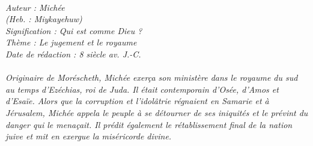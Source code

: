 \BFont
\noindent\hrulefill
{\footnotesize
\textit{
\bigskip
{\centering{}
\\Auteur : Michée
\\(Heb. : Miykayehuw)
\\Signification : Qui est comme Dieu ?
\\Thème : Le jugement et le royaume
\\Date de rédaction : 8 siècle av. J.-C.\\}
}
\textit{
\\Originaire de Moréscheth, Michée exerça son ministère dans le royaume du sud au temps d'Ezéchias, roi de Juda. Il était contemporain d'Osée, d'Amos et d'Esaïe. Alors que la corruption et l'idolâtrie régnaient en Samarie et à Jérusalem, Michée appela le peuple à se détourner de ses iniquités et le prévint du danger qui le menaçait. Il prédit également le rétablissement final de la nation juive et mit en exergue la miséricorde divine.\bigskip
}
}
\par\nobreak\noindent\hrulefill
